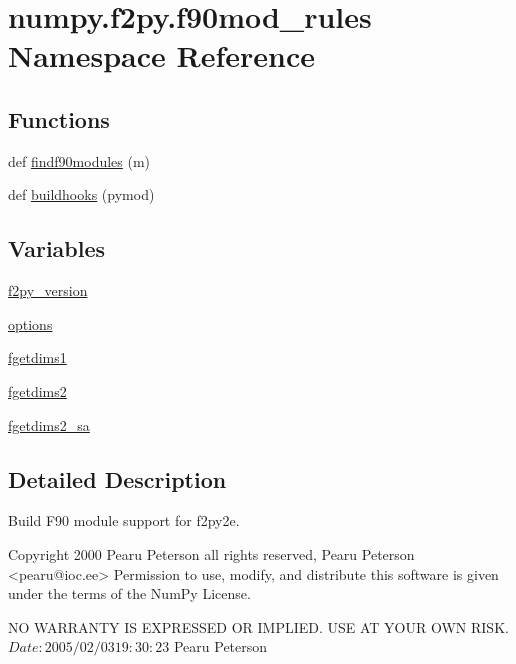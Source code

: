 \hypertarget{namespacenumpy_1_1f2py_1_1f90mod__rules}{}\section{numpy.\+f2py.\+f90mod\+\_\+rules Namespace Reference}
\label{namespacenumpy_1_1f2py_1_1f90mod__rules}
\subsection*{Functions}
\begin{DoxyCompactItemize}
\item 
def \hyperlink{namespacenumpy_1_1f2py_1_1f90mod__rules_a1a93b0463a50afbb3175f61cffae954f}{findf90modules} (m)
\item 
def \hyperlink{namespacenumpy_1_1f2py_1_1f90mod__rules_a6c134e1b60c9f460d7c7f9e53751e95e}{buildhooks} (pymod)
\end{DoxyCompactItemize}
\subsection*{Variables}
\begin{DoxyCompactItemize}
\item 
\hyperlink{namespacenumpy_1_1f2py_1_1f90mod__rules_aab7d5feee611d3215e3acee16a652d7a}{f2py\+\_\+version}
\item 
\hyperlink{namespacenumpy_1_1f2py_1_1f90mod__rules_a775781b15de0c356cfc69481df706b7a}{options}
\item 
\hyperlink{namespacenumpy_1_1f2py_1_1f90mod__rules_a380717e4d71a3e7c55d679a0eca62385}{fgetdims1}
\item 
\hyperlink{namespacenumpy_1_1f2py_1_1f90mod__rules_a93466968b427aa4dbf1cf7fa5831259d}{fgetdims2}
\item 
\hyperlink{namespacenumpy_1_1f2py_1_1f90mod__rules_a1710a99c314f2cec90f923caca5e21ee}{fgetdims2\+\_\+sa}
\end{DoxyCompactItemize}


\subsection{Detailed Description}
\begin{DoxyVerb}Build F90 module support for f2py2e.

Copyright 2000 Pearu Peterson all rights reserved,
Pearu Peterson <pearu@ioc.ee>
Permission to use, modify, and distribute this software is given under the
terms of the NumPy License.

NO WARRANTY IS EXPRESSED OR IMPLIED.  USE AT YOUR OWN RISK.
$Date: 2005/02/03 19:30:23 $
Pearu Peterson\end{DoxyVerb}
 

